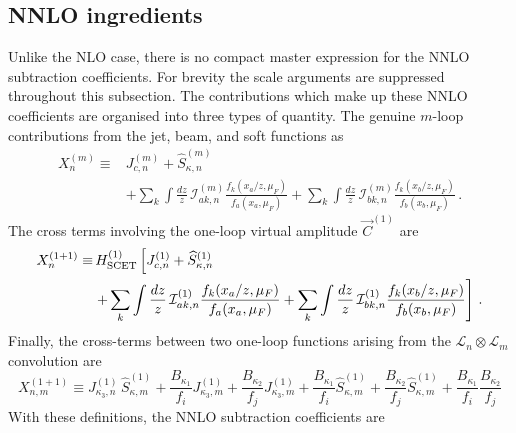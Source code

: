 \subsection{NNLO ingredients}
\label{subsec:NNLO-ingred}

Unlike the NLO case, there is no compact master expression for the
NNLO subtraction coefficients. For brevity the scale arguments are suppressed throughout this subsection. The contributions which make up these NNLO coefficients are organised into three types of quantity. The genuine $m$-loop contributions from the jet, beam, and soft functions as
\begin{equation}
\begin{aligned}
\label{eq:Xn-def}
    X_n^{(m)} \equiv &J_{c,n}^{(m)} + \widehat{S}_{\kappa,n}^{(m)} \\
&   + \sum_k\int\frac{dz}{z}\,\mathcal{I}_{ak,n}^{(m)}\frac{f_k(x_a/z,\mu_F)}{f_a(x_a,\mu_F)}
    + \sum_k\int\frac{dz}{z}\,\mathcal{I}_{bk,n}^{(m)}\frac{f_k(x_b/z,\mu_F)}{f_b(x_b,\mu_F)}\,.
    \end{aligned}
\end{equation}
The cross terms involving the one-loop
virtual amplitude $\vec{C}^{(1)}$ are
\begin{equation}
\label{eq:Xn11-def}
\begin{aligned}
    X_n^{(1+1)} \equiv& \,H^{(1)}_{\rm SCET}
    \left[J_{c,n}^{(1)} + \widehat{S}_{\kappa,n}^{(1)} \right.\\
  &\left.  + \sum_k\int\frac{dz}{z}\,\mathcal{I}_{ak,n}^{(1)}\frac{f_k(x_a/z,\mu_F)}{f_a(x_a,\mu_F)}
    + \sum_k\int\frac{dz}{z}\,\mathcal{I}_{bk,n}^{(1)}\frac{f_k(x_b/z,\mu_F)}{f_b(x_b,\mu_F)}\right]\,.
    \end{aligned}
\end{equation}
Finally, the cross-terms between two one-loop functions arising from the
$\mathcal{L}_n\otimes\mathcal{L}_m$ convolution are
\begin{equation}
\label{eq:Xnm11-def}
    X_{n,m}^{(1+1)} \equiv
J_{\kappa_3,n}^{(1)}\,\widehat{S}_{\kappa,m}^{(1)}+\frac{B_{\kappa_1}}{f_i}J_{\kappa_3,m}^{(1)}
    +\frac{B_{\kappa_2}}{f_j}J_{\kappa_3,m}^{(1)}+\frac{B_{\kappa_1}}{f_i}\widehat{S}_{\kappa,m}^{(1)}
    +\frac{B_{\kappa_2}}{f_j}\widehat{S}_{\kappa,m}^{(1)}+\frac{B_{\kappa_1}}{f_i}\frac{B_{\kappa_2}}{f_j}\end{equation}
With these definitions, the NNLO subtraction coefficients are
